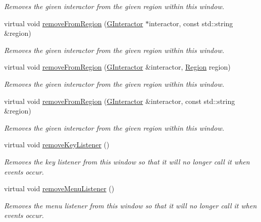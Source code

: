 \begin{DoxyCompactItemize}
\begin{DoxyCompactList}\small\item\em Removes the given interactor from the given region within this window. \end{DoxyCompactList}\item 
virtual void \mbox{\hyperlink{classGWindow_a16268c8344a5a5d9b10bde95764112d1}{remove\+From\+Region}} (\mbox{\hyperlink{classGInteractor}{G\+Interactor}} $\ast$interactor, const std\+::string \&region)
\begin{DoxyCompactList}\small\item\em Removes the given interactor from the given region within this window. \end{DoxyCompactList}\item 
virtual void \mbox{\hyperlink{classGWindow_afee7b65f917c4f6a0fdb1c8ea75406a5}{remove\+From\+Region}} (\mbox{\hyperlink{classGInteractor}{G\+Interactor}} \&interactor, \mbox{\hyperlink{classGWindow_a81a01a86de31071a92e6cce0bab9bc4b}{Region}} region)
\begin{DoxyCompactList}\small\item\em Removes the given interactor from the given region within this window. \end{DoxyCompactList}\item 
virtual void \mbox{\hyperlink{classGWindow_af7a055c83c0e0e3f3722596d7111fcbe}{remove\+From\+Region}} (\mbox{\hyperlink{classGInteractor}{G\+Interactor}} \&interactor, const std\+::string \&region)
\begin{DoxyCompactList}\small\item\em Removes the given interactor from the given region within this window. \end{DoxyCompactList}\item 
virtual void \mbox{\hyperlink{classGWindow_a43095f41cab3be732b49f29970484b05}{remove\+Key\+Listener}} ()
\begin{DoxyCompactList}\small\item\em Removes the key listener from this window so that it will no longer call it when events occur. \end{DoxyCompactList}\item 
virtual void \mbox{\hyperlink{classGWindow_a718d186fa807d6dec721c3b6f0c4309a}{remove\+Menu\+Listener}} ()
\begin{DoxyCompactList}\small\item\em Removes the menu listener from this window so that it will no longer call it when events occur. \end{DoxyCompactList}\item 

\end{DoxyCompactItemize}

